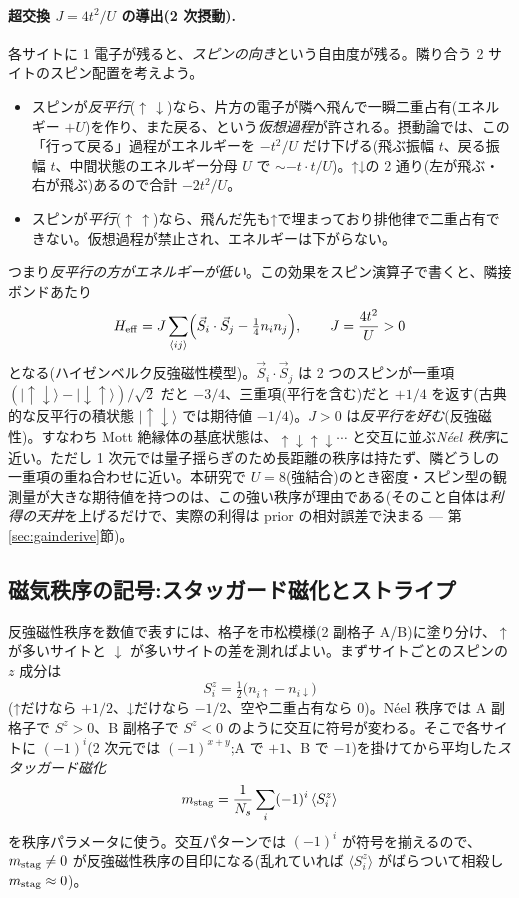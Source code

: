\documentclass[11pt,a4paper]{ltjsarticle}
\newcommand{\ket}[1]{|#1\rangle}
\newcommand{\ev}[1]{\langle #1\rangle}
\newcommand{\up}{\uparrow}
\newcommand{\dn}{\downarrow}
\begin{document}
\paragraph{超交換 $J=4t^2/U$ の導出(2 次摂動).}各サイトに 1 電子が残ると、\emph{スピンの向き}という自由度が残る。隣り合う 2 サイトのスピン配置を考えよう。
\begin{itemize}
  \item スピンが\emph{反平行}($\up\,\dn$)なら、片方の電子が隣へ飛んで一瞬二重占有(エネルギー $+U$)を作り、また戻る、という\emph{仮想過程}が許される。摂動論では、この「行って戻る」過程がエネルギーを $-t^2/U$ だけ下げる(飛ぶ振幅 $t$、戻る振幅 $t$、中間状態のエネルギー分母 $U$ で $\sim -t\cdot t/U$)。↑↓の 2 通り(左が飛ぶ・右が飛ぶ)あるので合計 $-2t^2/U$。
  \item スピンが\emph{平行}($\up\,\up$)なら、飛んだ先も↑で埋まっており排他律で二重占有できない。仮想過程が禁止され、エネルギーは下がらない。
\end{itemize}
つまり\emph{反平行の方がエネルギーが低い}。この効果をスピン演算子で書くと、隣接ボンドあたり
\begin{equation}
  H_{\rm eff} = J\sum_{\langle ij\rangle}\Bigl(\vec S_i\cdot\vec S_j - \tfrac14 n_i n_j\Bigr),\qquad
  J = \frac{4t^2}{U} > 0
  \label{eq:heisenberg}
\end{equation}
となる(ハイゼンベルク反強磁性模型)。$\vec S_i\cdot\vec S_j$ は 2 つのスピンが一重項 $(\ket{\up\dn}-\ket{\dn\up})/\sqrt2$ だと $-3/4$、三重項(平行を含む)だと $+1/4$ を返す(古典的な反平行の積状態 $\ket{\up\dn}$ では期待値 $-1/4$)。$J>0$ は\emph{反平行を好む}(反強磁性)。すなわち Mott 絶縁体の基底状態は、$\up\dn\up\dn\cdots$ と交互に並ぶ\emph{Néel 秩序}に近い。ただし 1 次元では量子揺らぎのため長距離の秩序は持たず、隣どうしの一重項の重ね合わせに近い。本研究で $U=8$(強結合)のとき密度・スピン型の観測量が大きな期待値を持つのは、この強い秩序が理由である(そのこと自体は\emph{利得の天井}を上げるだけで、実際の利得は prior の相対誤差で決まる — 第\ref{sec:gainderive}節)。

\subsection{磁気秩序の記号:スタッガード磁化とストライプ}
反強磁性秩序を数値で表すには、格子を市松模様(2 副格子 A/B)に塗り分け、$\up$ が多いサイトと $\dn$ が多いサイトの差を測ればよい。まずサイトごとのスピンの $z$ 成分は
\begin{equation}
  S^z_i = \tfrac12\bigl(n_{i\up}-n_{i\dn}\bigr)
\end{equation}
(↑だけなら $+1/2$、↓だけなら $-1/2$、空や二重占有なら $0$)。Néel 秩序では A 副格子で $S^z>0$、B 副格子で $S^z<0$ のように交互に符号が変わる。そこで各サイトに $(-1)^i$(2 次元では $(-1)^{x+y}$;A で $+1$、B で $-1$)を掛けてから平均した\emph{スタッガード磁化}
\begin{equation}
  m_{\rm stag} = \frac{1}{N_s}\sum_i (-1)^{i}\,\ev{S^z_i}
\end{equation}
を秩序パラメータに使う。交互パターンでは $(-1)^i$ が符号を揃えるので、$m_{\rm stag}\neq0$ が反強磁性秩序の目印になる(乱れていれば $\ev{S^z_i}$ がばらついて相殺し $m_{\rm stag}\approx0$)。
\end{document}
